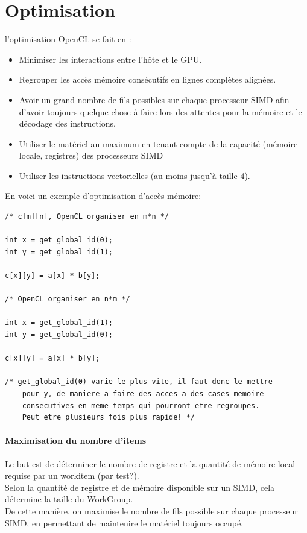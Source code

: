 \documentclass[oneside]{book}
\begin{document}
\section{Optimisation}
l'optimisation OpenCL se fait en :
\begin{itemize}
\item Minimiser les interactions entre l'hôte et le GPU.
\item Regrouper les accès mémoire consécutifs en lignes complètes
alignées.
\item Avoir un grand nombre de fils possibles sur chaque processeur
SIMD afin d'avoir toujours quelque chose à faire lors des
attentes pour la mémoire et le décodage des instructions.
\item Utiliser le matériel au maximum en tenant compte de la
capacité (mémoire locale, registres) des processeurs SIMD
\item Utiliser les instructions vectorielles (au moins jusqu'à taille 4).
\end{itemize}

En voici un exemple d'optimisation d'accès mémoire:
\begin{lstlisting}
/* c[m][n], OpenCL organiser en m*n */

int x = get_global_id(0);
int y = get_global_id(1);

c[x][y] = a[x] * b[y];

/* OpenCL organiser en n*m */

int x = get_global_id(1);
int y = get_global_id(0);

c[x][y] = a[x] * b[y];

/* get_global_id(0) varie le plus vite, il faut donc le mettre
	pour y, de maniere a faire des acces a des cases memoire
	consecutives en meme temps qui pourront etre regroupes.
	Peut etre plusieurs fois plus rapide! */
\end{lstlisting}
\paragraph{Maximisation du nombre d'items}
Le but est de déterminer le nombre de registre et la quantité de mémoire local requise par un workitem (par test?).\\

Selon la quantité de registre et de mémoire disponible sur un SIMD, cela détermine la taille du WorkGroup.\\

De cette manière, on maximise le nombre de fils possible sur chaque processeur SIMD, en permettant de maintenire le matériel toujours occupé.\\
\end{document}

